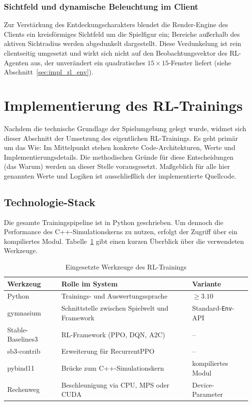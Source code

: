 \documentclass[
  a4paper,
  11pt,
  twoside,
  BCOR=8mm,           %
  headings=big,
  numbers=noenddot,
  listof=totoc,       %
  captions=tableheading,
]{scrreprt}
\begin{document}
\subsubsection{Sichtfeld und dynamische Beleuchtung im Client}
Zur Verstärkung des Entdeckungscharakters blendet die Render-Engine des Clients ein kreisförmiges Sichtfeld um die Spielfigur ein; Bereiche außerhalb des aktiven Sichtradius werden abgedunkelt dargestellt. Diese Verdunkelung ist rein clientseitig umgesetzt und wirkt sich nicht auf den Beobachtungsvektor des RL-Agenten aus, der unverändert ein quadratisches $15 \times 15$-Fenster liefert (siehe Abschnitt~\ref{sec:impl_rl_env}).

\section{Implementierung des RL-Trainings}
\label{sec:impl_rl}
Nachdem die technische Grundlage der Spielumgebung gelegt wurde, widmet sich dieser Abschnitt der Umsetzung des eigentlichen RL-Trainings. Es geht primär um das \glqq Wie\grqq: Im Mittelpunkt stehen konkrete Code-Architekturen, Werte und Implementierungsdetails. Die methodischen Gründe für diese Entscheidungen (das \glqq Warum\grqq) werden an dieser Stelle vorausgesetzt. Maßgeblich für alle hier genannten Werte und Logiken ist ausschließlich der implementierte Quellcode.

\subsection{Technologie-Stack}
\label{sec:impl_rl_stack}
Die gesamte Trainingspipeline ist in Python geschrieben. Um dennoch die Performance des C++-Simulationskerns zu nutzen, erfolgt der Zugriff über ein kompiliertes Modul. Tabelle~\ref{tab:rl_stack} gibt einen kurzen Überblick über die verwendeten Werkzeuge.

\begin{table}[htbp]
    \centering
    \caption{Eingesetzte Werkzeuge des RL-Trainings}
    \label{tab:rl_stack}
    \begin{tabular}{p{3.4cm}p{6.6cm}p{3.4cm}}
        \toprule
        \textbf{Werkzeug} & \textbf{Rolle im System} & \textbf{Variante} \\
        \midrule
        Python & Trainings- und Auswertungssprache & $\ge 3.10$ \\
        gymnasium & Schnittstelle zwischen Spielwelt und Framework & Standard-\texttt{Env}-API \\
        Stable-Baselines3 & RL-Framework (PPO, DQN, A2C) & -- \\
        sb3-contrib & Erweiterung für RecurrentPPO & -- \\
        pybind11 & Brücke zum C++-Simulationskern & kompiliertes Modul \\
        Rechenweg & Beschleunigung via CPU, MPS oder CUDA & Device-Parameter \\
        \bottomrule
    \end{tabular}
\end{table}
\end{document}

